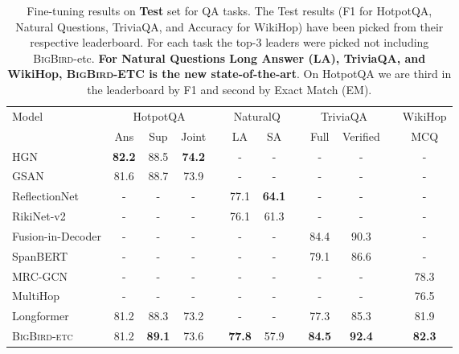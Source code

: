 \documentclass{article}
\newcommand{\bigb}{\textsc{BigBird}\xspace}
\begin{document}
\begin{table}
    \centering
    \small
    \begin{tabular}{@{}l c c ccc c cc c cc@{}}
    \toprule
    \multirow{2}{*}{Model} & 
    \multicolumn{3}{c}{HotpotQA} & &
    \multicolumn{2}{c}{NaturalQ} & &
    \multicolumn{2}{c}{TriviaQA} & &
    WikiHop\\
    \cmidrule{2-4} \cmidrule{6-7} \cmidrule{9-10} \cmidrule{12-12} 
    & Ans & Sup & Joint  &&  LA & SA && Full & Verified && MCQ  \\
    \midrule
    HGN \citep{fang2019hierarchical}         & \textbf{82.2} & 88.5 & \textbf{74.2} &&  -   &  -   &&  -   &  -   &&  -   \\
    GSAN                                     & 81.6 & 88.7 & 73.9 &&  -   &  -   &&  -   &  -   &&  -   \\
    ReflectionNet \citep{gong2020reflection} &  -   &  -   &  -   && 77.1 & \textbf{64.1} &&  -   &  -   &&  -   \\
    RikiNet-v2 \citep{liu2020rikinet}           &  -   &  -   &  -   && 76.1 & 61.3 &&  -   &  -   &&  -   \\
    Fusion-in-Decoder \citep{izacard2020fid} &  -   &  -   &  -   &&  -   &  -   && 84.4 & 90.3 &&  -   \\
    SpanBERT \citep{joshi2020spanbert}       &  -   &  -   &  -   &&  -   &  -   && 79.1 & 86.6 &&  -   \\ 
    MRC-GCN \citep{tang2020multi}            &  -   &  -   &  -   &&  -   &  -   &&  -   &  -   && 78.3 \\
    MultiHop \citep{chen2019multi}           &  -   &  -   &  -   &&  -   &  -   &&  -   &  -   && 76.5 \\
    Longformer \citep{beltagy2020longformer} & 81.2 & 88.3 & 73.2 &&  -   &  -   && 77.3 & 85.3 && 81.9 \\
    \midrule
    \bigb-\textsc{etc} & 81.2 & \textbf{89.1} & 73.6 && \textbf{77.8} & 57.9 && \textbf{84.5} & \textbf{92.4} && \textbf{82.3} \\
    \bottomrule
    \end{tabular}
    \vspace{2mm}
    \caption{Fine-tuning results on \textbf{Test} set for QA tasks. The Test results (F1 for HotpotQA, Natural Questions, TriviaQA, and Accuracy for WikiHop) have been picked from their respective leaderboard. For each task the top-3 leaders were picked not including \bigb-etc. \textbf{For Natural Questions Long Answer (LA), TriviaQA, and WikiHop, \bigb-ETC is the new state-of-the-art}. On HotpotQA we are third in the leaderboard by F1 and second by Exact Match (EM).}
    \label{tab:QATest}
\end{table}
\end{document}
